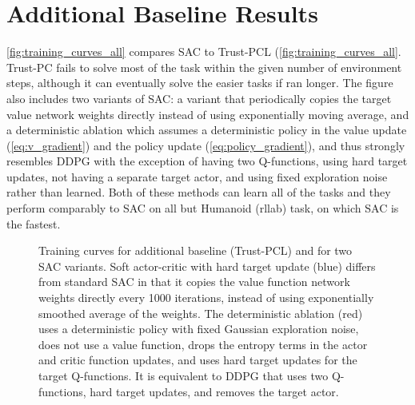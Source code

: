 \documentclass{article}
\begin{document}
\newpage
\section{Additional Baseline Results}
\label{app:benchmarks}
\autoref{fig:training_curves_all} compares SAC to Trust-PCL (\autoref{fig:training_curves_all}. Trust-PC fails to solve most of the task within the given number of environment steps, although it can eventually solve the easier tasks \citep{nachum2017trust} if ran longer. The figure also includes two variants of SAC: a variant that periodically copies the target value network weights directly instead of using exponentially moving average, and a deterministic ablation which assumes a deterministic policy in the value update (\autoref{eq:v_gradient}) and the policy update (\autoref{eq:policy_gradient}), and thus strongly resembles DDPG with the exception of having two Q-functions, using hard target updates, not having a separate target actor, and using  fixed exploration noise rather than learned. Both of these methods can learn all of the tasks and they perform comparably to SAC on all but Humanoid (rllab) task, on which SAC is the fastest. 

\begin{figure*}[h]
    \centering
    \caption{\small Training curves for additional baseline (Trust-PCL) and for two SAC variants. Soft actor-critic with hard target update (blue) differs from standard SAC in that it copies the value function network weights directly every 1000 iterations, instead of using exponentially smoothed average of the weights. The deterministic ablation (red) uses a deterministic policy with fixed Gaussian exploration noise, does not use a value function, drops the entropy terms in the actor and critic function updates, and uses hard target updates for the target Q-functions. It is equivalent to DDPG that uses two Q-functions, hard target updates, and removes the target actor.}
	\label{fig:training_curves_all}
 \end{figure*}
\end{document}
